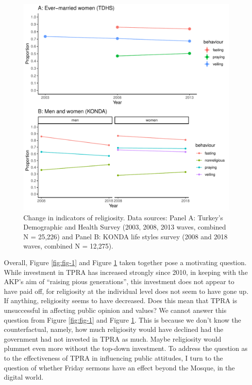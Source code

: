 \documentclass[
  12pt,
]{article}
\begin{document}
\begin{figure}

{\centering \includegraphics{Khutbas_files/figure-latex/fig-2-1} 

}

\caption{Change in indicators of religiosity. Data sources: Panel A: Turkey's Demographic and Health Survey (2003, 2008, 2013 waves, combined N = 25,226) and Panel B: KONDA life styles survey (2008 and 2018 waves, combined N = 12,275).}\label{fig:fig-2}
\end{figure}

Overall, Figure \ref{fig:fig-1} and Figure \ref{fig:fig-2} taken together pose a motivating question. While investment in TPRA has increased strongly since 2010, in keeping with the AKP's aim of ``raising pious generations'', this investment does not appear to have paid off, for religiosity at the individual level does not seem to have gone up. If anything, religiosity seems to have decreased. Does this mean that TPRA is unsuccessful in affecting public opinion and values? We cannot answer this question from Figure \ref{fig:fig-1} and Figure \ref{fig:fig-2}. This is because we don't know the counterfactual, namely, how much religiosity would have declined had the government had not invested in TPRA as much. Maybe religiosity would plummet even more without the top-down investment. To address the question as to the effectiveness of TPRA in influencing public attitudes, I turn to the question of whether Friday sermons have an effect beyond the Mosque, in the digital world.
\end{document}
